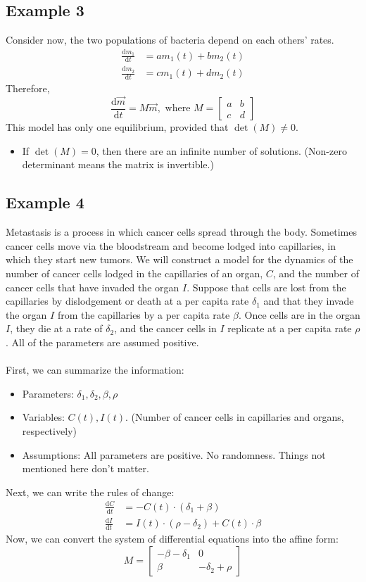 \documentclass[10pt]{article}
\newcommand{\dd}{\text{d}}
\begin{document}
\subsection*{Example 3}
Consider now, the two populations of bacteria depend on each others' rates.
\begin{align*}
    \frac{\dd m_1}{\dd t} &= a m_1(t) + b m_2(t) \\
    \frac{\dd m_2}{\dd t} &= c m_1(t) + d m_2(t)
\end{align*}
Therefore, 
\[\frac{\dd \vec{m}}{\dd t} = M \vec{m}, \text{ where } M = \begin{bmatrix} a & b \\ c & d \end{bmatrix}\]
This model has only one equilibrium, provided that $\det(M) \neq 0$.
\begin{itemize}
	\item If $\det(M) = 0$, then there are an infinite number of solutions.  (Non-zero determinant means the matrix is invertible.)
\end{itemize}

\subsection*{Example 4}
Metastasis is a process in which cancer cells spread through the body.  Sometimes cancer cells move via the bloodstream and become lodged into capillaries, in which they start new tumors.  We will construct a model for the dynamics of the number of cancer cells lodged in the capillaries of an organ, $C$, and the number of cancer cells that have invaded the organ $I$.  Suppose that cells are lost from the capillaries by dislodgement or death at a per capita rate $\delta_1$ and that they invade the organ $I$ from the capillaries by a per capita rate $\beta$.  Once cells are in the organ $I$, they die at a rate of $\delta_2$, and the cancer cells in $I$ replicate at a per capita rate $\rho$.  All of the parameters are assumed positive.\\\\
First, we can summarize the information:
\begin{itemize}
	\item Parameters: $\delta_1, \delta_2, \beta, \rho$
	\item Variables: $C(t), I(t)$.  (Number of cancer cells in capillaries and organs, respectively)
	\item Assumptions: All parameters are positive.  No randomness.  Things not mentioned here don't matter.
\end{itemize}
Next, we can write the rules of change:
\begin{align*}
    \frac{\dd C}{\dd t} &= - C(t) \cdot (\delta_1 + \beta)\\
    \frac{\dd I}{\dd t} &= I(t) \cdot (\rho - \delta_2) + C(t) \cdot \beta
\end{align*}
Now, we can convert the system of differential equations into the affine form:
\[M = \begin{bmatrix} - \beta - \delta_1 & 0 \\ \beta & -\delta_2 + \rho \end{bmatrix}\]
\end{document}
